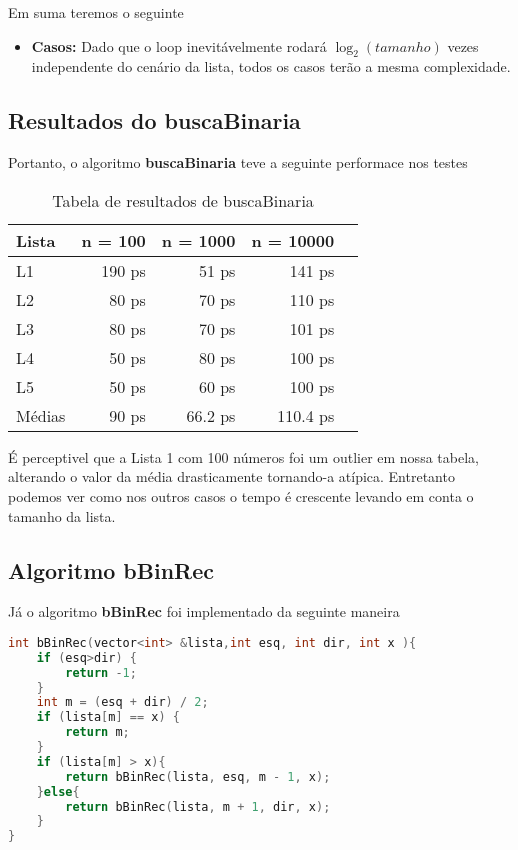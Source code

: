 Em suma teremos o seguinte

\begin{itemize}
  \item \textbf{Casos:} Dado que o loop inevitávelmente rodará $\log_2 ({tamanho})$ vezes independente do cenário da lista, todos os casos terão a mesma complexidade.
 
\end{itemize}

\subsection{Resultados do buscaBinaria}

Portanto, o algoritmo \textbf{buscaBinaria} teve a seguinte performace nos testes

\begin{table}[h!]
	\centering
	\caption{Tabela de resultados de buscaBinaria}
	\label{tab:busc_bin_result}
	\begin{tabular}{lrrrr}
		\toprule
		Lista   & n = 100   & n = 1000  & n = 10000 \\
		\midrule
		L1      & 190 ps    & 51 ps    & 141 ps  \\
		L2      & 80 ps    & 70 ps    & 110 ps  \\
		L3      & 80 ps    & 70 ps    & 101 ps  \\
		L4      & 50 ps    & 80 ps    & 100 ps  \\
		L5      & 50 ps    & 60 ps    & 100 ps  \\
		\midrule
		Médias  & 90 ps  & 66.2 ps  & 110.4 ps \\
		\bottomrule
	\end{tabular}
\end{table}

É perceptivel que a Lista 1 com 100 números foi um outlier em nossa tabela, alterando o valor da média drasticamente tornando-a atípica. Entretanto podemos ver como nos outros casos o tempo é crescente levando em conta o tamanho da lista.

\subsection{Algoritmo bBinRec}

Já o algoritmo \textbf{bBinRec} foi implementado da seguinte maneira 

\begin{lstlisting}[language=C++]
int bBinRec(vector<int> &lista,int esq, int dir, int x ){
    if (esq>dir) {
        return -1;
    }
    int m = (esq + dir) / 2;
    if (lista[m] == x) {
        return m;
    }
    if (lista[m] > x){
        return bBinRec(lista, esq, m - 1, x);
    }else{
        return bBinRec(lista, m + 1, dir, x);
    }
}
\end{lstlisting}

